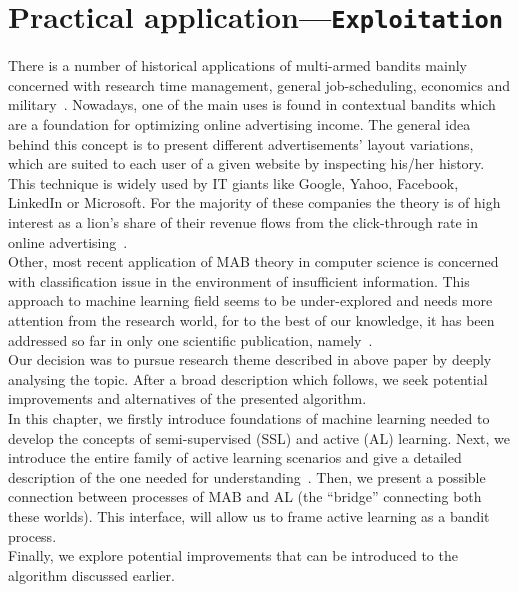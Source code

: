 \documentclass[12pt, a4paper, pdflatex, leqno, twoside]{report}
\begin{document}
\chapter{Practical application---\texttt{\textbf{Exploitation}}\label{ch:MAB-AL}}

There is a number of historical applications of multi-armed bandits 
mainly concerned with research time management, general job-scheduling, 
economics and military~\citep{gittins+glazebrook+weber}.
Nowadays, one of the main uses is found in contextual bandits which are a
foundation for optimizing online advertising income. The general idea behind 
this concept is to present different advertisements' layout variations,
which are suited to each user of a given website by inspecting his/her history. This technique is 
widely used by IT giants like Google, Yahoo, Facebook, LinkedIn or Microsoft.
 For the majority of these companies the theory is of high interest as a lion's 
share of their revenue flows from the click-through rate in online 
advertising~\citep{graepel2010web, Scott:2010:MBL:1944422.1944432}.\\


Other, most recent application of MAB theory in computer science is concerned 
with classification issue in the environment of insufficient information. This 
approach to machine learning field seems to be under-explored and needs more 
attention from the research world, for to the best of our knowledge, it has 
been addressed so far in only one scientific publication, 
namely~\citep{DBLP:journals/corr/GantiG13}.\\
Our decision was to pursue research theme described in above paper by deeply analysing the topic. After a broad description which follows, we seek potential improvements and alternatives of the presented 
algorithm.\\

In this chapter, we firstly introduce foundations of machine learning needed to develop the concepts 
of semi-supervised (SSL) and active (AL) learning. Next, we introduce the entire 
family of active learning scenarios and give a detailed description of the one 
needed for understanding~\citep{DBLP:journals/corr/GantiG13}. Then, we present a
possible connection between processes of MAB and AL (the ``bridge'' connecting both these worlds). This interface, will allow us 
to frame active learning as a bandit process.\\
Finally, we explore potential improvements that can be introduced to the algorithm discussed earlier.
\end{document}
